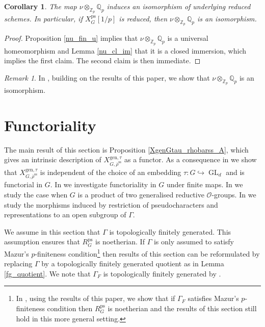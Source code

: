 \documentclass{amsart}
\newtheorem{cor}[prop]{Corollary}
\theoremstyle{definition}
\theoremstyle{remark}
\newtheorem{remar}[prop]{Remark}
\DeclareMathOperator{\GL}{GL}
\newcommand{\Qp}{\mathbb {Q}_p}
\newcommand{\Zp}{\mathbb{Z}_p}
\newcommand{\OO}{\mathcal O}
\newcommand{\rhobar}{\overline{\rho}}
\newcommand{\ps}{\mathrm{ps}}
\newcommand{\gen}{\mathrm{gen}}
\newcommand{\rhobarss}{\rhobar^{\mathrm{ss}}}
\begin{document}
\begin{cor}\label{nu_iso_red} The map $\nu \otimes_{\Zp} \Qp$ induces an isomorphism of underlying reduced schemes. 
In particular,  if $X^{\ps}_G[1/p]$ is reduced, then $\nu \otimes_{\Zp} \Qp$ is an isomorphism.
\end{cor}

\begin{proof} Proposition \ref{nu_fin_u} implies that $\nu \otimes_{\Zp} \Qp$ is a universal homeomorphism 
and Lemma \ref{nu_cl_im} that it is a closed immersion, which implies the first claim. 
The second claim is then immediate. 
\end{proof} 

\begin{remar} In \cite{inf_laf}, building on the results of this paper, we show that $\nu\otimes_{\Zp} \Qp$ is an isomorphism. 
\end{remar}


\section{Functoriality}\label{sec_funct}

The main result of this section is Proposition \ref{XgenGtau_rhobarss_A}, 
which gives an intrinsic description of 
$X^{\gen, \tau}_{G, \rhobarss}$ as a functor. 
As a consequence 
in   we show that
$X^{\gen, \tau}_{G, \rhobarss}$ is independent of the choice of an embedding $\tau: G\hookrightarrow \GL_d$ and  is 
functorial in $G$.  In   
we investigate functoriality in $G$ under finite maps. In  
we study the case when  $G$ is a product of two generalised reductive $\OO$-groups. In 
we study the morphisms induced  by restriction of pseudocharacters and representations to an open subgroup of $\Gamma$. 

We assume in this section that $\Gamma$ is topologically finitely generated. This assumption 
ensures that $R^{\ps}_G$ is noetherian. If $\Gamma$ is only assumed to satisfy Mazur's $p$-finiteness
condition\footnote{In \cite{noeth_def}, using the results of this paper, we show that if $\Gamma_F$ satisfies Mazur's $p$-finiteness condition then $R^{\ps}_G$ is noetherian and the results of this section still hold in this more general setting.} then results of this section can be reformulated by replacing $\Gamma$ by a topologically
finitely generated quotient as in Lemma \ref{fg_quotient}. We note that $\Gamma_F$ is topologically finitely generated by \cite[Satz 3.6]{Jannsen1982}. 
\end{document}
